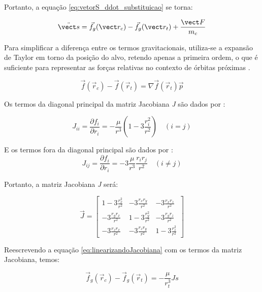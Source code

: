 Portanto, a equação \eqref{eq:vetorS_ddot_substituicao} se torna:

\begin{equation}
\label{eq:fg_rc_fg_rt}
\ddot{\vect s} = \vec f_g(\vect r_c) - \vec f_g(\vect r_t) + \frac{\vect F}{m_c}
\end{equation}

Para simplificar a diferença entre os termos gravitacionais, utiliza-se a expansão de Taylor em torno da posição do alvo, retendo apenas a primeira ordem, o que é suficiente para representar as forças relativas no contexto de órbitas próximas \cite{arantes2011}.

\begin{equation}
\label{eq:linearizandoJacobiana}
\vec f(\vec r_c) - \vec f(\vec r_t) = \nabla \vec f(\vec r_t)\vec p
\end{equation}

Os termos da diagonal principal da matriz Jacobiana \emph{J} são dados por \cite{fehse2003}:

\begin{equation}
\label{eq:jacobianaDiagonal}
J_{ii} = \frac{\partial f_i}{\partial r_i} = -\frac{\mu}{r^3} \left(1 - 3\frac{r_i^2}{r^2}\right) \quad (i = j)
\end{equation}

E os termos fora da diagonal principal são dados por \cite{fehse2003}:
\begin{equation}
\label{eq:jacobianaForaDiagonal}
J_{ij} = \frac{\partial f_i}{\partial r_i} = -3 \frac{\mu}{r^3} \frac{r_i r_j}{r^2} \quad (i \neq j)
\end{equation}

Portanto, a matriz Jacobiana \emph{J} será:

\begin{equation}
    \label{eq:jacobianaGenerica}
\vec J = 
\begin{bmatrix}
1 - 3\frac{r_x^2}{r^2} &  -3\frac{r_x r_y}{r^2} &  -3\frac{r_x r_z}{r^2} \\
-3\frac{r_y r_x}{r^2} & 1 - 3\frac{r_y^2}{r^2} & -3\frac{r_y r_z}{r^2} \\
-3\frac{r_z r_x}{r^2} & -3\frac{r_z r_y}{r^2} & 1 - 3\frac{r_z^2}{r^2}
\end{bmatrix}
\end{equation}

Reescrevendo a equação \eqref{eq:linearizandoJacobiana} com os termos da matriz Jacobiana, temos:

\begin{equation}
\label{eq:linearizandoJacobiana2}
\vec f_g(\vec r_c) - \vec f_g(\vec r_t) = -\frac{\mu}{r_t^3} Js
\end{equation}

